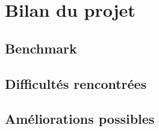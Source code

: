 \chapter{Bilan du projet}
 \section{Benchmark}
 \section{Difficultés rencontrées}
 \section{Améliorations possibles}
